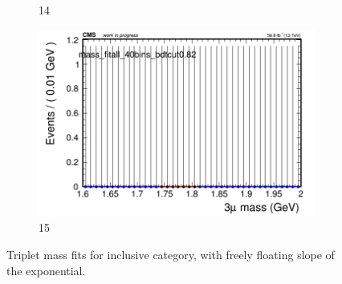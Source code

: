 \begin{figure}[h!]
\begin{subfigure}{0.2\textwidth}
        \caption{14}
    \end{subfigure}
    \begin{subfigure}{0.2\textwidth}
        \includegraphics[width=\textwidth]{power_law/plots/all/massfit_all_40bins_bdtcut0.82.png}
        \caption{15}
    \end{subfigure}
    \caption{Triplet mass fits for inclusive category, with freely floating slope of the exponential.}
    \label{fig:unfixed_all}
\end{figure}

